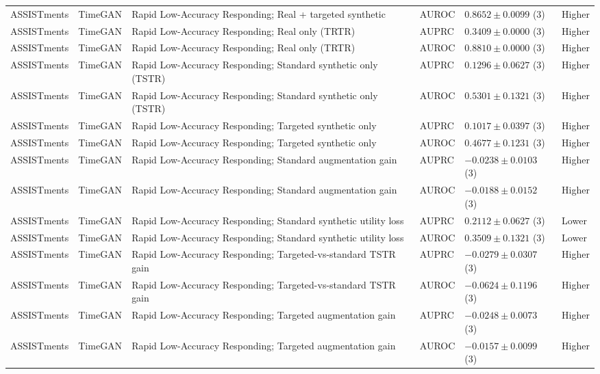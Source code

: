 \begin{longtable}{@{}p{2.25cm}p{2.05cm}p{4.7cm}p{5.0cm}p{2.6cm}p{1.25cm}@{}}
ASSISTments & TimeGAN & Rapid Low-Accuracy Responding; Real + targeted synthetic & AUROC & $0.8652 \mathbin{\pm} 0.0099$ (3) & Higher \\
ASSISTments & TimeGAN & Rapid Low-Accuracy Responding; Real only (TRTR) & AUPRC & $0.3409 \mathbin{\pm} 0.0000$ (3) & Higher \\
ASSISTments & TimeGAN & Rapid Low-Accuracy Responding; Real only (TRTR) & AUROC & $0.8810 \mathbin{\pm} 0.0000$ (3) & Higher \\
ASSISTments & TimeGAN & Rapid Low-Accuracy Responding; Standard synthetic only (TSTR) & AUPRC & $0.1296 \mathbin{\pm} 0.0627$ (3) & Higher \\
ASSISTments & TimeGAN & Rapid Low-Accuracy Responding; Standard synthetic only (TSTR) & AUROC & $0.5301 \mathbin{\pm} 0.1321$ (3) & Higher \\
ASSISTments & TimeGAN & Rapid Low-Accuracy Responding; Targeted synthetic only & AUPRC & $0.1017 \mathbin{\pm} 0.0397$ (3) & Higher \\
ASSISTments & TimeGAN & Rapid Low-Accuracy Responding; Targeted synthetic only & AUROC & $0.4677 \mathbin{\pm} 0.1231$ (3) & Higher \\
ASSISTments & TimeGAN & Rapid Low-Accuracy Responding; Standard augmentation gain & AUPRC & $-0.0238 \mathbin{\pm} 0.0103$ (3) & Higher \\
ASSISTments & TimeGAN & Rapid Low-Accuracy Responding; Standard augmentation gain & AUROC & $-0.0188 \mathbin{\pm} 0.0152$ (3) & Higher \\
ASSISTments & TimeGAN & Rapid Low-Accuracy Responding; Standard synthetic utility loss & AUPRC & $0.2112 \mathbin{\pm} 0.0627$ (3) & Lower \\
ASSISTments & TimeGAN & Rapid Low-Accuracy Responding; Standard synthetic utility loss & AUROC & $0.3509 \mathbin{\pm} 0.1321$ (3) & Lower \\
ASSISTments & TimeGAN & Rapid Low-Accuracy Responding; Targeted-vs-standard TSTR gain & AUPRC & $-0.0279 \mathbin{\pm} 0.0307$ (3) & Higher \\
ASSISTments & TimeGAN & Rapid Low-Accuracy Responding; Targeted-vs-standard TSTR gain & AUROC & $-0.0624 \mathbin{\pm} 0.1196$ (3) & Higher \\
ASSISTments & TimeGAN & Rapid Low-Accuracy Responding; Targeted augmentation gain & AUPRC & $-0.0248 \mathbin{\pm} 0.0073$ (3) & Higher \\
ASSISTments & TimeGAN & Rapid Low-Accuracy Responding; Targeted augmentation gain & AUROC & $-0.0157 \mathbin{\pm} 0.0099$ (3) & Higher \\

\end{longtable}
